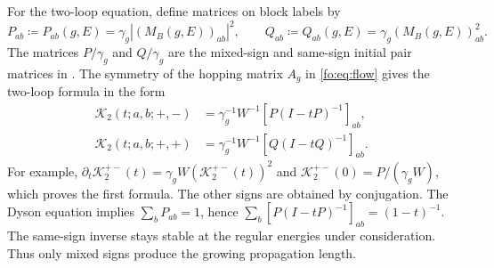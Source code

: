 \documentclass[11pt]{article}
\numberwithin{equation}{section}
\theoremstyle{remark}
\newcommand{\cK}{\mathcal K}
\begin{document}
For the two-loop equation, define matrices on block labels by
\begin{equation}\label{fo:eq:PQ}
 P_{ab}\coloneqq P_{ab}(g,E)=\gamma_g|(M_B(g,E))_{ab}|^2,\qquad
 Q_{ab}\coloneqq Q_{ab}(g,E)=\gamma_g(M_B(g,E))_{ab}^2.
\end{equation}
The matrices $P/\gamma_g$ and $Q/\gamma_g$ are the mixed-sign and
same-sign initial pair matrices in \cite[Definition~3.8, (3.31)]{TYY}.
The symmetry of the hopping matrix $A_g$ in \eqref{fo:eq:flow} gives the two-loop formula
\cite[Example~3.12, (3.47)]{TYY} in the form
\begin{equation}\label{fo:eq:pairs}
 \begin{aligned}
 \cK_2(t;a,b;+,-)&=\gamma_g^{-1}W^{-1} [P(I-tP)^{-1}]_{ab},\\
 \cK_2(t;a,b;+,+)&=\gamma_g^{-1}W^{-1} [Q(I-tQ)^{-1}]_{ab}.
 \end{aligned}
\end{equation}
For example, \(\partial_t\cK_2^{+-}(t)=\gamma_g W(\cK_2^{+-}(t))^2\)
and \(\cK_2^{+-}(0)=P/(\gamma_g W)\), which proves the first
formula. The other signs are obtained by conjugation.
The Dyson equation implies \(\sum_bP_{ab}=1\), hence
\(\sum_b[P(I-tP)^{-1}]_{ab}=(1-t)^{-1}\).
The same-sign inverse stays stable at the regular energies under
consideration. Thus only mixed signs produce the growing propagation
length.
\end{document}
